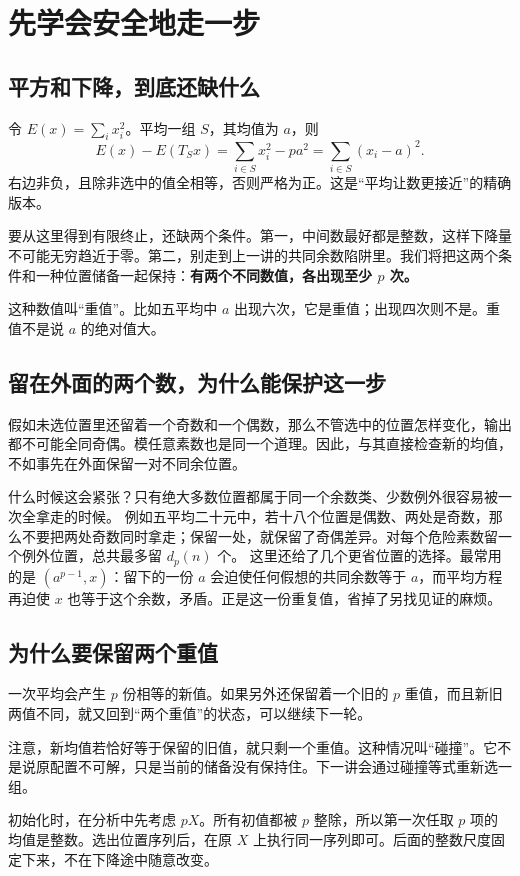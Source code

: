 \chapter{先学会安全地走一步}\label{sec:descent}
\section{平方和下降，到底还缺什么}
令 $E(x)=\sum_i x_i^2$。平均一组 $S$，其均值为 $a$，则
\[
E(x)-E(T_Sx)=\sum_{i\in S}x_i^2-pa^2
=\sum_{i\in S}(x_i-a)^2.
\]
右边非负，且除非选中的值全相等，否则严格为正。这是“平均让数更接近”的精确版本。

要从这里得到有限终止，还缺两个条件。第一，中间数最好都是整数，这样下降量不可能无穷趋近于零。第二，别走到上一讲的共同余数陷阱里。我们将把这两个条件和一种位置储备一起保持：\textbf{有两个不同数值，各出现至少 $p$ 次。}

这种数值叫“重值”。比如五平均中 $a$ 出现六次，它是重值；出现四次则不是。重值不是说 $a$ 的绝对值大。

\section{留在外面的两个数，为什么能保护这一步}
假如未选位置里还留着一个奇数和一个偶数，那么不管选中的位置怎样变化，输出都不可能全同奇偶。模任意素数也是同一个道理。因此，与其直接检查新的均值，不如事先在外面保留一对不同余位置。

什么时候这会紧张？只有绝大多数位置都属于同一个余数类、少数例外很容易被一次全拿走的时候。
例如五平均二十元中，若十八个位置是偶数、两处是奇数，那么不要把两处奇数同时拿走；保留一处，就保留了奇偶差异。对每个危险素数留一个例外位置，总共最多留 $d_p(n)$ 个。
这里还给了几个更省位置的选择。最常用的是 $(a^{p-1},x)$：留下的一份 $a$ 会迫使任何假想的共同余数等于 $a$，而平均方程再迫使 $x$ 也等于这个余数，矛盾。正是这一份重复值，省掉了另找见证的麻烦。

\section{为什么要保留两个重值}
一次平均会产生 $p$ 份相等的新值。如果另外还保留着一个旧的 $p$ 重值，而且新旧两值不同，就又回到“两个重值”的状态，可以继续下一轮。

注意，新均值若恰好等于保留的旧值，就只剩一个重值。这种情况叫“碰撞”。它不是说原配置不可解，只是当前的储备没有保持住。下一讲会通过碰撞等式重新选一组。

初始化时，在分析中先考虑 $pX$。所有初值都被 $p$ 整除，所以第一次任取 $p$ 项的均值是整数。选出位置序列后，在原 $X$ 上执行同一序列即可。后面的整数尺度固定下来，不在下降途中随意改变。

